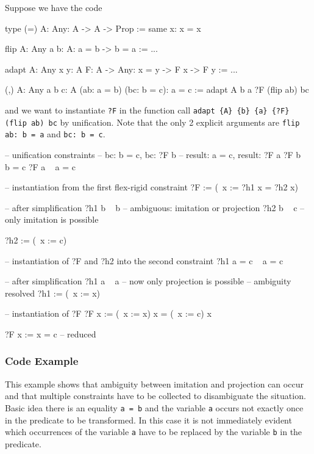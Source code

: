 Suppose we have the code
\begin{alba}
    type (=) {A: Any}: A -> A -> Prop :=
        same {x}: x = x

    flip {A: Any} {a b: A}: a = b -> b = a :=
        ...

    adapt {A: Any} {x y: A} {F: A -> Any}: x = y -> F x -> F y :=
        ...

    (,) {A: Any} {a b c: A} (ab: a = b) (bc: b = c): a = c :=
        adapt {A} {b} {a} {?F} (flip ab) bc
\end{alba}
%
and we want to instantiate {\tt ?F} in the function call
{\tt adapt \{A\} \{b\} \{a\} \{?F\} (flip ab) bc}
by unification. Note that the only 2 explicit arguments are
{\tt flip ab: b = a} and {\tt bc: b = c}.

\begin{alba}
    -- unification constraints
    --    bc: b = c,      bc: ?F b
    --    result: a = c,  result: ?F a
    ?F b   ~   b = c
    ?F a   ~   a = c

    -- instantiation from the first flex-rigid constraint
    ?F := (\ x := ?h1 x = ?h2 x)

    -- after simplification
    ?h1 b  ~  b             -- ambiguous: imitation or projection
    ?h2 b  ~  c             -- only imitation is possible

    ?h2 := (\ x := c)

    -- instantiation of ?F and ?h2 into the second constraint
    ?h1 a = c    ~    a = c

    -- after simplification
    ?h1 a  ~  a             -- now only projection is possible
                            -- ambiguity resolved
    ?h1 := (\ x := x)

    -- instantiation of ?F
    ?F x := (\ x := x) x = (\ x := c) x

    ?F x := x = c   -- reduced
\end{alba}






\subsubsection{Code Example}


This example shows that ambiguity between imitation and projection can occur and
that multiple constraints have to be collected to disambiguate the situation.
Basic idea there is an equality {\tt a = b} and the variable {\tt a} occurs not
exactly once in the predicate to be transformed. In this case it is not
immediately evident which occurrences of the variable {\tt a} have to be
replaced by the variable {\tt b} in the predicate.

